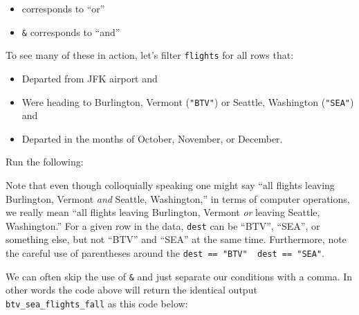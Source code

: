 \documentclass[12pt, krantz2,]{krantz}
\makeatletter
\newenvironment{Shaded}{\begin{snugshade}}{\end{snugshade}}
\newcommand{\DecValTok}[1]{\textcolor[rgb]{0.06,0.06,0.06}{#1}}
\newcommand{\KeywordTok}[1]{\textcolor[rgb]{0.27,0.27,0.27}{\textbf{#1}}}
\newcommand{\NormalTok}[1]{#1}
\newcommand{\OperatorTok}[1]{\textcolor[rgb]{0.43,0.43,0.43}{\textbf{#1}}}
\newcommand{\StringTok}[1]{\textcolor[rgb]{0.5,0.5,0.5}{#1}}
\providecommand{\tightlist}{%
  \setlength{\itemsep}{0pt}\setlength{\parskip}{0pt}}
\newenvironment{kframe}{%
\medskip{}
\setlength{\fboxsep}{.8em}
 \def\at@end@of@kframe{}%
 \ifinner\ifhmode%
  \def\at@end@of@kframe{\end{minipage}}%
  \begin{minipage}{\columnwidth}%
 \fi\fi%
 \def\FrameCommand##1{\hskip\@totalleftmargin \hskip-\fboxsep
 \colorbox{shadecolor}{##1}\hskip-\fboxsep
     \hskip-\linewidth \hskip-\@totalleftmargin \hskip\columnwidth}%
 \MakeFramed {\advance\hsize-\width
   \@totalleftmargin\z@ \linewidth\hsize
   \@setminipage}}%
 {\par\unskip\endMakeFramed%
 \at@end@of@kframe}
\renewenvironment{Shaded}{\begin{kframe}}{\end{kframe}}
\makeatother
\begin{document}
\begin{itemize}
\tightlist
\item
  \texttt{\textbar{}} corresponds to ``or''
\item
  \texttt{\&} corresponds to ``and''
\end{itemize}

To see many of these in action, let's filter \texttt{flights} for all rows that:

\begin{itemize}
\tightlist
\item
  Departed from JFK airport and
\item
  Were heading to Burlington, Vermont (\texttt{"BTV"}) or Seattle, Washington (\texttt{"SEA"}) and
\item
  Departed in the months of October, November, or December.
\end{itemize}

Run the following:

\begin{Shaded}
\end{Shaded}

Note that even though colloquially speaking one might say ``all flights leaving Burlington, Vermont \emph{and} Seattle, Washington,'' in terms of computer operations, we really mean ``all flights leaving Burlington, Vermont \emph{or} leaving Seattle, Washington.'' For a given row in the data, \texttt{dest} can be ``BTV'', ``SEA'', or something else, but not ``BTV'' and ``SEA'' at the same time. Furthermore, note the careful use of parentheses around the \texttt{dest\ ==\ "BTV"\ \textbar{}\ dest\ ==\ "SEA"}.

We can often skip the use of \texttt{\&} and just separate our conditions with a comma. In other words the code above will return the identical output \texttt{btv\_sea\_flights\_fall} as this code below:

\begin{Shaded}
\end{Shaded}
\end{document}
